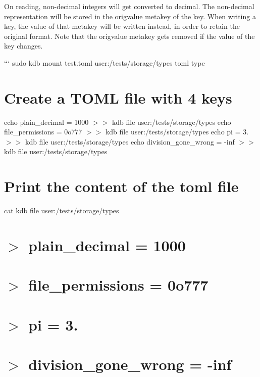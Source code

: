 On reading, non-\/decimal integers will get converted to decimal. The non-\/decimal representation will be stored in the {\ttfamily origvalue} metakey of the key. When writing a key, the value of that metakey will be written instead, in order to retain the original format. Note that the {\ttfamily origvalue} metakey gets removed if the value of the key changes.

``` sudo kdb mount test.\+toml user\+:/tests/storage/types toml type\hypertarget{autotoc_md642_autotoc_md646}{}\section{Create a T\+O\+M\+L file with 4 keys}\label{autotoc_md642_autotoc_md646}
echo \textquotesingle{}plain\+\_\+decimal = 1000\textquotesingle{} $>$$>$ {\ttfamily kdb file user\+:/tests/storage/types} echo \textquotesingle{}file\+\_\+permissions = 0o777\textquotesingle{} $>$$>$ {\ttfamily kdb file user\+:/tests/storage/types} echo \textquotesingle{}pi = 3.\textquotesingle{} $>$$>$ {\ttfamily kdb file user\+:/tests/storage/types} echo \textquotesingle{}division\+\_\+gone\+\_\+wrong = -\/inf\textquotesingle{} $>$$>$ {\ttfamily kdb file user\+:/tests/storage/types}\hypertarget{autotoc_md642_autotoc_md647}{}\section{Print the content of the toml file}\label{autotoc_md642_autotoc_md647}
cat {\ttfamily kdb file user\+:/tests/storage/types} \hypertarget{autotoc_md642_autotoc_md648}{}\section{$>$ plain\+\_\+decimal = 1000}\label{autotoc_md642_autotoc_md648}
\hypertarget{autotoc_md642_autotoc_md649}{}\section{$>$ file\+\_\+permissions = 0o777}\label{autotoc_md642_autotoc_md649}
\hypertarget{autotoc_md642_autotoc_md650}{}\section{$>$ pi = 3.}\label{autotoc_md642_autotoc_md650}
\hypertarget{autotoc_md642_autotoc_md651}{}\section{$>$ division\+\_\+gone\+\_\+wrong = -\/inf}\label{autotoc_md642_autotoc_md651}
